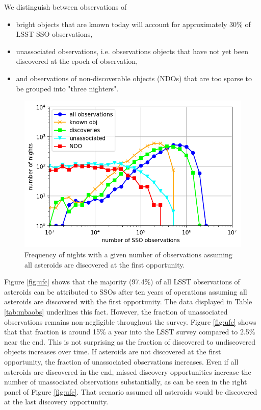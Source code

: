 We distinguish between observations of
\begin{itemize}
\item bright objects that are known today will account for approximately 30\% of \gls{LSST} \gls{SSO} observations,
\item unassociated observations, i.e. observations objects that have not yet been discovered at the \gls{epoch} of observation,
\item and observations of non-discoverable objects (NDOs) that are too sparse to be grouped into "three nighters".

\end{itemize}
%
\begin{figure}[tb!]
\begin{center}
\includegraphics[width=0.7\linewidth]{figs/nights_vs_obs.png}
\end{center}
\caption{Frequency of nights with a given number of observations assuming all asteroids are discovered at the first opportunity.\label{fig:obs_stats}}
\end{figure}
Figure \ref{fig:ufc} shows that the majority (97.4\%) of all \gls{LSST} observations of asteroids can be attributed to SSOs after ten years of operations assuming all asteroids are discovered with the first opportunity. The data displayed in Table \ref{tab:mbaobs} underlines this fact.
However, the fraction of unassociated observations remains non-negligible throughout the survey.
Figure \ref{fig:ufc} shows that that fraction is around 15\% a year into the \gls{LSST} survey compared to 2.5\% near the end. This is not surprising as the fraction of discovered to undiscovered objects increases over time.
If asteroids are not discovered at the first opportunity, the fraction of unassociated observations increases. 
Even if all asteroids are discovered in the end, missed discovery opportunities increase the number of unassociated observations substantially, as can be seen in the right panel of Figure \ref{fig:ufc}. That scenario assumed all asteroids would be discovered at the last discovery opportunity.


